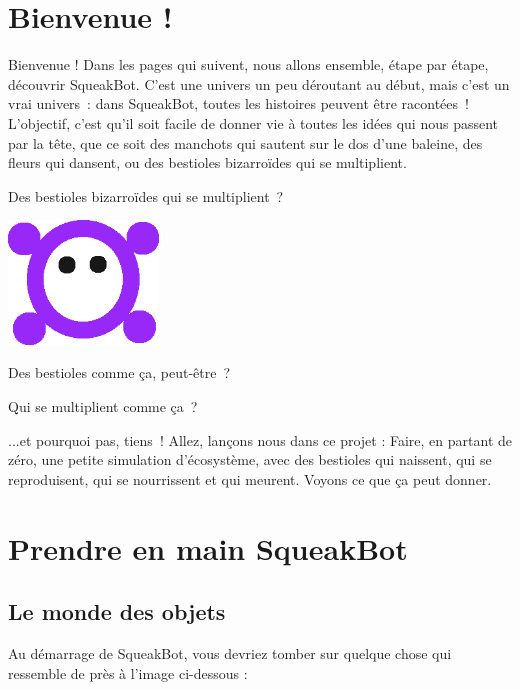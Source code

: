 \documentclass[a4paper,12pt]{book}
\def\appName{SqueakBot}
\begin{document}
\chapter{Bienvenue !}

Bienvenue ! Dans les pages qui suivent, nous allons ensemble, étape par étape, découvrir \appName. C'est une univers un peu déroutant au début, mais c'est un vrai univers~: dans \appName, toutes les histoires peuvent être racontées~! L'objectif, c'est qu'il soit facile de donner vie à toutes les idées qui nous passent par la tête, que ce soit des manchots qui sautent sur le dos d'une baleine, des fleurs qui dansent, ou des bestioles bizarroïdes qui se multiplient.

Des bestioles bizarroïdes qui se multiplient~?

\begin{center}
    \includegraphics[width=4cm]{bestiole.png}
\end{center}

Des bestioles comme ça, peut-être~?


Qui se multiplient comme ça~?

...et pourquoi pas, tiens~! Allez, lançons nous dans ce projet : Faire, en partant de zéro, une petite simulation d'écosystème, avec des bestioles qui naissent, qui se reproduisent, qui se nourrissent et qui meurent. Voyons ce que ça peut donner.

\chapter{Prendre en main \appName}

\section{Le monde des objets}

Au démarrage de \appName, vous devriez tomber sur quelque chose qui ressemble de près à l'image ci-dessous :
\end{document}
